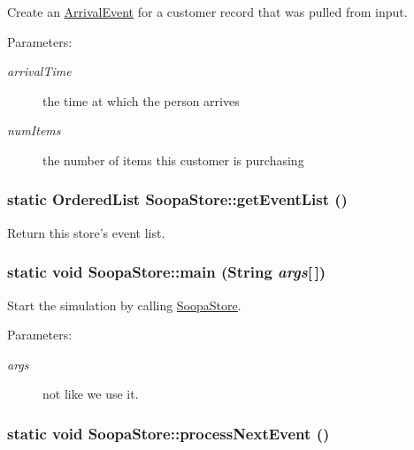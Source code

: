 Create an \hyperlink{class_arrival_event}{ArrivalEvent} for a customer record that was pulled from input. 

\begin{Desc}
\item[Parameters:]
\begin{description}
\item[{\em arrivalTime}]the time at which the person arrives \item[{\em numItems}]the number of items this customer is purchasing \end{description}
\end{Desc}
\hypertarget{class_soopa_store_cb13f3037f1ccb3e1ff74527ed2d5a68}{
\subsubsection[{getEventList}]{\setlength{\rightskip}{0pt plus 5cm}static {\bf OrderedList} SoopaStore::getEventList ()}}
\label{class_soopa_store_cb13f3037f1ccb3e1ff74527ed2d5a68}


Return this store's event list. 

\hypertarget{class_soopa_store_7dcaea26d0ff077426773425ea274c9b}{
\subsubsection[{main}]{\setlength{\rightskip}{0pt plus 5cm}static void SoopaStore::main (String {\em args}\mbox{[}$\,$\mbox{]})}}
\label{class_soopa_store_7dcaea26d0ff077426773425ea274c9b}


Start the simulation by calling \hyperlink{class_soopa_store}{SoopaStore}. 

\begin{Desc}
\item[Parameters:]
\begin{description}
\item[{\em args}]not like we use it. \end{description}
\end{Desc}
\hypertarget{class_soopa_store_084115ff6adac00d13503ea1f3dc8cb9}{
\subsubsection[{processNextEvent}]{\setlength{\rightskip}{0pt plus 5cm}static void SoopaStore::processNextEvent ()}}
\label{class_soopa_store_084115ff6adac00d13503ea1f3dc8cb9}


